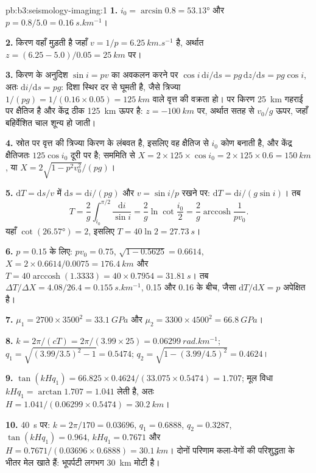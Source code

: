 \begin{solution}{pb:b3:seismology-imaging:1}
\textbf{1.} $i_0 = \arcsin 0.8 = \ang{53.13}$ और $p = 0.8/5.0 =
\qty{0.16}{s.km^{-1}}$।

\textbf{2.} किरण वहाँ मुड़ती है जहाँ $v = 1/p = \qty{6.25}{km.s^{-1}}$ है, अर्थात
$z = (6.25 - 5.0)/0.05 = \qty{25}{km}$ पर।

\textbf{3.} किरण के अनुदिश $\sin i = pv$ का अवकलन करने पर $\cos i\,\mathrm di/
\mathrm ds = pg\,\mathrm dz/\mathrm ds = pg\cos i$, अतः $\mathrm di/\mathrm ds =
pg$: दिशा स्थिर दर से घूमती है, जैसे त्रिज्या
$1/(pg) = 1/(0.16\times0.05) = \qty{125}{km}$ वाले वृत्त की वक्रता हो।  पर किरण
\qty{25}{km} गहराई पर क्षैतिज है और केंद्र ठीक \qty{125}{km}
ऊपर है: $z = \qty{-100}{km}$ पर, अर्थात सतह से $v_0/g$ ऊपर, जहाँ
बहिर्वेशित चाल शून्य हो जाती।

\textbf{4.} स्रोत पर वृत्त की त्रिज्या किरण के लंबवत है,
इसलिए वह क्षैतिज से $i_0$ कोण बनाती है, और केंद्र
क्षैतिजतः $125\cos i_0$ दूरी पर है; सममिति से
$X = 2\times125\times\cos i_0 = 2\times125\times0.6 = \qty{150}{km}$, या
$X = 2\sqrt{1 - p^2v_0^2}/(pg)$।

\textbf{5.} $\mathrm dT = \mathrm ds/v$ में $\mathrm ds = \mathrm di/(pg)$ और
$v = \sin i/p$ रखने पर: $\mathrm dT = \mathrm di/(g\sin i)$। तब
\[
  T = \frac2g\int_{i_0}^{\pi/2}\frac{\mathrm di}{\sin i} = \frac2g\ln\cot\frac{i_0}2 =
  \frac2g\operatorname{arccosh}\frac1{pv_0} .
\]
यहाँ $\cot(\ang{26.57}) = 2$, इसलिए
$T = 40\ln2 = \qty{27.73}{s}$।

\textbf{6.} $p = 0.15$ के लिए: $pv_0 = 0.75$, $\sqrt{1 - 0.5625} = 0.6614$,
$X = 2\times0.6614/0.0075 = \qty{176.4}{km}$ और $T = 40\operatorname{arccosh}
(1.3333) = 40\times0.7954 = \qty{31.81}{s}$। तब $\Delta T/\Delta X =
4.08/26.4 = \qty{0.155}{s.km^{-1}}$, 0.15 और 0.16 के बीच, जैसा
$\mathrm dT/\mathrm dX = p$ अपेक्षित है।

\textbf{7.} $\mu_1 = 2700\times3500^2 = \qty{33.1}{GPa}$ और
$\mu_2 = 3300\times4500^2 = \qty{66.8}{GPa}$।

\textbf{8.} $k = 2\pi/(cT) = 2\pi/(3.99\times25) = \qty{0.06299}{rad.km^{-1}}$;
$q_1 = \sqrt{(3.99/3.5)^2 - 1} = 0.5474$; $q_2 = \sqrt{1 - (3.99/4.5)^2} = 0.4624$।

\textbf{9.} $\tan(kHq_1) = 66.825\times0.4624/(33.075\times0.5474) = 1.707$;
मूल विधा $kHq_1 = \arctan1.707 = 1.041$ लेती है, अतः
$H = 1.041/(0.06299\times0.5474) = \qty{30.2}{km}$।

\textbf{10.} \qty{40}{s} पर: $k = 2\pi/170 = 0.03696$, $q_1 = 0.6888$,
$q_2 = 0.3287$, $\tan(kHq_1) = 0.964$, $kHq_1 = 0.7671$ और
$H = 0.7671/(0.03696\times0.6888) = \qty{30.1}{km}$। दोनों परिणाम
कला-वेगों की परिशुद्धता के भीतर मेल खाते हैं: भूपर्पटी लगभग \qty{30}{km} मोटी है।


\end{solution}
